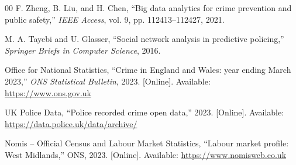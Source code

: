 \documentclass[conference]{IEEEtran}
\begin{document}
\begin{thebibliography}{00}
 F. Zheng, B. Liu, and H. Chen, ``Big data analytics for crime prevention and public safety,'' \textit{IEEE Access}, vol. 9, pp. 112413--112427, 2021.

 M. A. Tayebi and U. Glasser, ``Social network analysis in predictive policing,'' \textit{Springer Briefs in Computer Science}, 2016.

 Office for National Statistics, ``Crime in England and Wales: year ending March 2023,'' \textit{ONS Statistical Bulletin}, 2023. [Online]. Available: \url{https://www.ons.gov.uk}

 UK Police Data, ``Police recorded crime open data,'' 2023. [Online]. Available: \url{https://data.police.uk/data/archive/}

 Nomis -- Official Census and Labour Market Statistics, ``Labour market profile: West Midlands,'' ONS, 2023. [Online]. Available: \url{https://www.nomisweb.co.uk}

\end{thebibliography}
\end{document}
